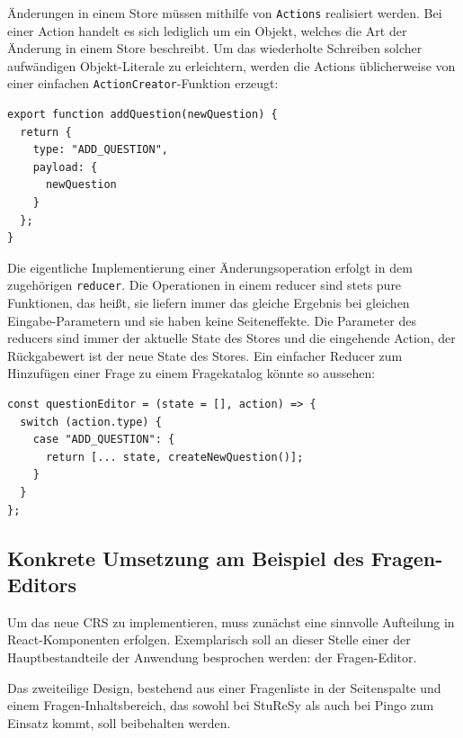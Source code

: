 Änderungen in einem Store müssen mithilfe von \texttt{Actions} realisiert werden. Bei einer Action handelt es sich lediglich um ein Objekt, welches die Art der Änderung in einem Store beschreibt. Um das wiederholte Schreiben solcher aufwändigen Objekt-Literale zu erleichtern, werden die Actions üblicherweise von einer einfachen \texttt{ActionCreator}-Funktion erzeugt:

\begin{minipage}{\linewidth}
\begin{lstlisting}[caption={Ein Action-Objekt ist lediglich die Beschreibung einer Änderungsoperation und wird in einem ActionCreator erzeugt.}]
export function addQuestion(newQuestion) {
  return {
    type: "ADD_QUESTION",
    payload: {
      newQuestion
    }
  };
}
\end{lstlisting}
\end{minipage}

Die eigentliche Implementierung einer Änderungsoperation erfolgt in dem zugehörigen \texttt{reducer}. Die Operationen in einem reducer sind stets pure Funktionen, das heißt, sie liefern immer das gleiche Ergebnis bei gleichen Eingabe-Parametern und sie haben keine Seiteneffekte. Die Parameter des reducers sind immer der aktuelle State des Stores und die eingehende Action, der Rückgabewert ist der neue State des Stores. Ein einfacher Reducer zum Hinzufügen einer Frage zu einem Fragekatalog könnte so aussehen:

\begin{minipage}{\linewidth}
\begin{lstlisting}[caption={In einem Reducer werden die Änderungsoperationen eines Stores als pure Funktion implementiert.}]
const questionEditor = (state = [], action) => {
  switch (action.type) {
    case "ADD_QUESTION": {
      return [... state, createNewQuestion()];
    }
  }
};
\end{lstlisting}
\end{minipage}

\subsection{Konkrete Umsetzung am Beispiel des Fragen-Editors}
Um das neue CRS zu implementieren, muss zunächst eine sinnvolle Aufteilung in React-Komponenten erfolgen. Exemplarisch soll an dieser Stelle einer der Hauptbestandteile der Anwendung besprochen werden: der Fragen-Editor.

Das zweiteilige Design, bestehend aus einer Fragenliste in der Seitenspalte und einem Fragen-Inhaltsbereich, das sowohl bei StuReSy als auch bei Pingo zum Einsatz kommt, soll beibehalten werden.


